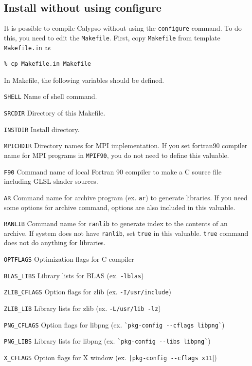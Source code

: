 \subsection{Install without using configure}
\label{section:no_configure}
It is possible to compile Calypso without using the \verb|configure| command. To do this, you need to edit the \verb|Makefile|. First, copy \verb|Makefile| from template \verb|Makefile.in| as
%
\begin{verbatim}
% cp Makefile.in Makefile
\end{verbatim}
In Makefile, the following variables should be defined.
%
\begin{description}
\item{\verb|SHELL|}    Name of shell command.
\item{\verb|SRCDIR|}   Directory of this Makefile. 
\item{\verb|INSTDIR|}  Install directory.
\item{\verb|MPICHDIR|} Directory names for MPI implementation. If you set fortran90 compiler name for MPI programs in \verb|MPIF90|, you do not need to define this valuable.
\item{\verb|F90|} Command name of local Fortran 90 compiler to make a C source file including GLSL shader sources.
\item{\verb|AR|}  Command name for archive program (ex. \verb|ar|) to generate libraries. If you need some options for archive command, options are also included in this valuable.
\item{\verb|RANLIB|} Command name for \verb|ranlib| to generate index to the contents of an archive. If system does not have \verb|ranlib|, set \verb|true| in this valuable. \verb|true| command does not do anything for libraries.
\item{}
\item{\verb|OPTFLAGS|}  Optimization flags for C compiler
\item{\verb|BLAS_LIBS|} Library lists for BLAS  (ex.      \verb|-lblas|)
\item{\verb|ZLIB_CFLAGS|} Option flags for zlib  (ex.     \verb|-I/usr/include|)
\item{\verb|ZLIB_LIB|}   Library lists for zlib (ex.      \verb|-L/usr/lib -lz|)
\item{\verb|PNG_CFLAGS|} Option flags for libpng  (ex.    \verb|`pkg-config --cflags libpng`|)
\item{\verb|PNG_LIBS|}   Library lists for libpng (ex.    \verb|`pkg-config --libs libpng`|)
\item{\verb|X_CFLAGS|} Option flags for X window  (ex.    \verb`|pkg-config --cflags x11`|)

\end{description}
